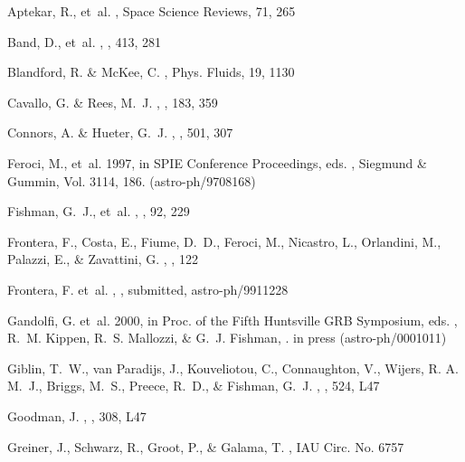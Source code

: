 \documentclass{aastex}
\begin{document}
\begin{multicols}{2}
\begin{thebibliography}{}
 {Aptekar}, R., et~al.
, Space Science Reviews, 71, 265

 {Band}, D., et~al.
, \apj, 413, 281

Blandford, R. \& McKee, C.
, Phys. Fluids, 19, 1130

{Cavallo}, G. \& {Rees}, M.~J.
, \mnras, 183, 359

{Connors}, A. \& {Hueter}, G.~J.
, \apj, 501, 307

 {Feroci}, M., et~al. 1997, in {SPIE Conference Proceedings},  eds. , Siegmund
  \& Gummin, Vol. 3114, 186.
\newblock (astro-ph/9708168)

 {Fishman}, G.~J., et~al.
, \apjs, 92, 229

Frontera, F., Costa, E., Fiume, D.~D., Feroci, M., Nicastro, L., Orlandini, M.,
  Palazzi, E., \& Zavattini, G.
, \aaps, 122

Frontera, F. et~al.
, \apjs, submitted, astro-ph/9911228

Gandolfi, G. et~al. 2000, in Proc. of the Fifth Huntsville GRB Symposium,  eds.
  , R.~M. Kippen, R.~S. Mallozzi, \& G.~J. Fishman, .
\newblock in press (astro-ph/0001011)

{Giblin}, T.~W., {van Paradijs}, J., {Kouveliotou}, C., {Connaughton}, V.,
  {Wijers}, R. A. M.~J., {Briggs}, M.~S., {Preece}, R.~D., \& {Fishman}, G.~J.
, \apjl, 524, L47

{Goodman}, J.
, \apjl, 308, L47

Greiner, J., Schwarz, R., Groot, P., \& Galama, T.
, IAU Circ. No. 6757


\end{thebibliography}
\end{multicols}
\end{document}
